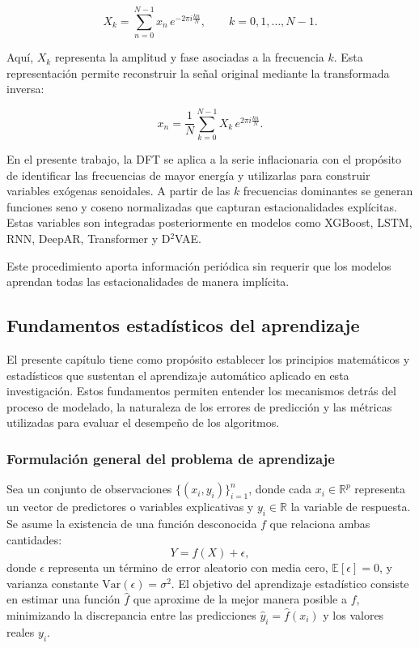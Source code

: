 \documentclass[12pt,letterpaper]{article}
\begin{document}
\begin{equation}
    X_k = \sum_{n=0}^{N-1} x_n\, e^{-2\pi i \frac{kn}{N}},
    \qquad k = 0, 1, \dots, N-1.
\end{equation}

Aquí, \(X_k\) representa la amplitud y fase asociadas a la frecuencia \(k\). Esta representación 
permite reconstruir la señal original mediante la transformada inversa:

\begin{equation}
    x_n = \frac{1}{N} \sum_{k=0}^{N-1} X_k\, e^{2\pi i \frac{kn}{N}}.
\end{equation}

En el presente trabajo, la DFT se aplica a la serie inflacionaria con el propósito de identificar 
las frecuencias de mayor energía y utilizarlas para construir variables exógenas senoidales. A 
partir de las \(k\) frecuencias dominantes se generan funciones seno y coseno normalizadas que 
capturan estacionalidades explícitas. Estas variables son integradas posteriormente en modelos 
como XGBoost, LSTM, RNN, DeepAR, Transformer y D$^2$VAE.

Este procedimiento aporta información periódica sin requerir que los modelos aprendan todas las 
estacionalidades de manera implícita.

\subsection{Fundamentos estadísticos del aprendizaje}

El presente capítulo tiene como propósito establecer los principios matemáticos y estadísticos que sustentan el aprendizaje automático aplicado en esta investigación. Estos fundamentos permiten entender los mecanismos detrás del proceso de modelado, la naturaleza de los errores de predicción y las métricas utilizadas para evaluar el desempeño de los algoritmos.

\subsubsection{Formulación general del problema de aprendizaje}
Sea un conjunto de observaciones $\{(x_i, y_i)\}_{i=1}^{n}$, donde cada $x_i \in \mathbb{R}^p$ representa un vector de predictores o variables explicativas y $y_i \in \mathbb{R}$ la variable de respuesta.  
Se asume la existencia de una función desconocida $f$ que relaciona ambas cantidades:
\[
Y = f(X) + \epsilon,
\]
donde $\epsilon$ representa un término de error aleatorio con media cero, $\mathbb{E}[\epsilon] = 0$, y varianza constante $\text{Var}(\epsilon) = \sigma^2$.  
El objetivo del aprendizaje estadístico consiste en estimar una función $\hat{f}$ que aproxime de la mejor manera posible a $f$, minimizando la discrepancia entre las predicciones $\hat{y}_i = \hat{f}(x_i)$ y los valores reales $y_i$.
\end{document}
